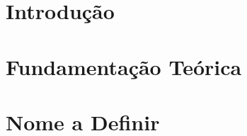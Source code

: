 \documentclass[qualificacao,doutorado]{packages/icmc}
\begin{document}
{
\textual
}

\justifying



\chapter{Introdução}
\label{chapter:introducao}


\chapter{Fundamentação Teórica}
\label{chapter:fundamentacao}


\chapter{Nome a Definir}
\label{chapter:nome}





% 

\postextual






\end{document}
